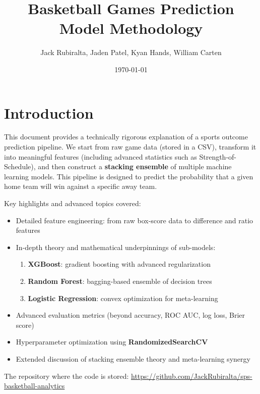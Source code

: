 \documentclass[12pt]{article}
\title{Basketball Games Prediction Model Methodology}
\author{Jack Rubiralta, Jaden Patel, Kyan Hands, William Carten}
\date{\today}
\begin{document}
\maketitle
\pagebreak

\section{Introduction}
This document provides a technically rigorous explanation of a sports outcome prediction pipeline. We start from raw game data (stored in a CSV), transform it into meaningful features (including advanced statistics such as Strength-of-Schedule), and then construct a \textbf{stacking ensemble} of multiple machine learning models. This pipeline is designed to predict the probability that a given home team will win against a specific away team.

Key highlights and advanced topics covered:
\begin{itemize}[noitemsep]
    \item Detailed feature engineering: from raw box-score data to difference and ratio features
    \item In-depth theory and mathematical underpinnings of sub-models:
    \begin{enumerate}[label=\arabic*)]
        \item \textbf{XGBoost}: gradient boosting with advanced regularization
        \item \textbf{Random Forest}: bagging-based ensemble of decision trees
        \item \textbf{Logistic Regression}: convex optimization for meta-learning
    \end{enumerate}
    \item Advanced evaluation metrics (beyond accuracy, ROC AUC, log loss, Brier score)
    \item Hyperparameter optimization using \textbf{RandomizedSearchCV}
    \item Extended discussion of stacking ensemble theory and meta-learning synergy
\end{itemize}

The repository where the code is stored: \url{https://github.com/JackRubiralta/sps-basketball-analytics}

\end{document}
